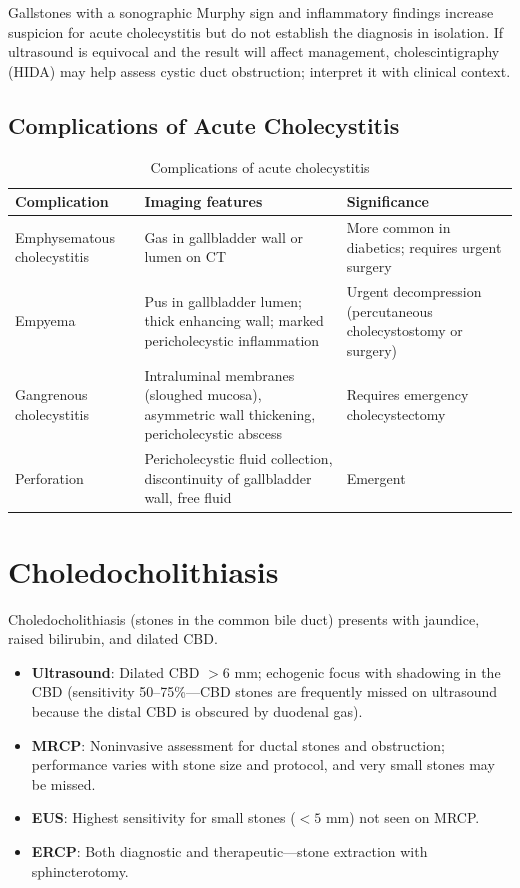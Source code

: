 Gallstones with a sonographic Murphy sign and inflammatory findings increase suspicion for acute cholecystitis but do not establish the diagnosis in isolation. If ultrasound is equivocal and the result will affect management, cholescintigraphy (HIDA) may help assess cystic duct obstruction; interpret it with clinical context.

\subsection{Complications of Acute Cholecystitis}
\begin{table}[h]
\centering
\caption{Complications of acute cholecystitis}
\begin{tabular}{p{3cm} p{4.5cm} p{4cm}}
\hline
\textbf{Complication} & \textbf{Imaging features} & \textbf{Significance} \\
\hline
Emphysematous cholecystitis & Gas in gallbladder wall or lumen on CT & More common in diabetics; requires urgent surgery \\
Empyema & Pus in gallbladder lumen; thick enhancing wall; marked pericholecystic inflammation & Urgent decompression (percutaneous cholecystostomy or surgery) \\
Gangrenous cholecystitis & Intraluminal membranes (sloughed mucosa), asymmetric wall thickening, pericholecystic abscess & Requires emergency cholecystectomy \\
Perforation & Pericholecystic fluid collection, discontinuity of gallbladder wall, free fluid & Emergent \\
\hline
\end{tabular}
\end{table}


\section{Choledocholithiasis}
Choledocholithiasis (stones in the common bile duct) presents with jaundice, raised bilirubin, and dilated CBD.

\begin{itemize}
  \item \textbf{Ultrasound}: Dilated CBD $> 6$ mm; echogenic focus with shadowing in the CBD (sensitivity 50--75\%---CBD stones are frequently missed on ultrasound because the distal CBD is obscured by duodenal gas).
  \item \textbf{MRCP}: Noninvasive assessment for ductal stones and obstruction; performance varies with stone size and protocol, and very small stones may be missed.
  \item \textbf{EUS}: Highest sensitivity for small stones ($< 5$ mm) not seen on MRCP.
  \item \textbf{ERCP}: Both diagnostic and therapeutic---stone extraction with sphincterotomy.
\end{itemize}

